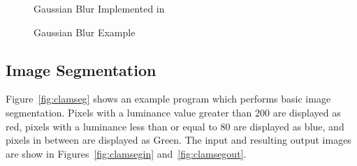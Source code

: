 \begin{figure}[hb!]
  \begin{center}
  
  \caption{Gaussian Blur Implemented in \sys{}}
  \label{fig:clamblur}
  \end{center}
\end{figure}
{
  \captionsetup{justification=centering}
  \begin{figure}[h!]
    \centering
    \hfill
    \hfill
    \captionsetup{font=bf}
    \caption{Gaussian Blur \sys{} Example}
  \end{figure}
}

\clearpage
\subsection{Image Segmentation}
Figure~\ref{fig:clamseg} shows an example \sys{} program which performs
basic image segmentation. Pixels with a luminance value greater than 200 are
displayed as red, pixels with a luminance less than or equal to 80 are displayed as blue,
and pixels in between are displayed as Green. The input and resulting output images are show in
Figures~\ref{fig:clamsegin} and~\ref{fig:clamsegout}.

